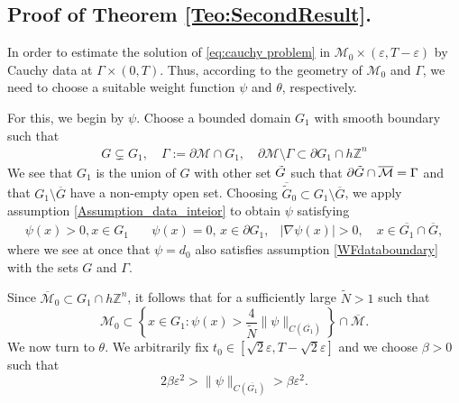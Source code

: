 \documentclass[11pt,oneside,leqno]{amsart}
\numberwithin{equation}{section}
\numberwithin{equation}{section}
\begin{document}
\subsection{Proof of Theorem \ref{Teo:SecondResult}.}\label{subsec:proofsecondresult}
In order to estimate the solution of \eqref{eq:cauchy problem} in $\mathcal{M}_0\times(\varepsilon,T-\varepsilon)$ by Cauchy data at $\Gamma\times(0,T)$. Thus, according to the geometry of $\mathcal{M}_0$ and $\Gamma$, we need to choose a suitable weight function $\psi$ and $\theta$, respectively. 

For this, we begin by $\psi$.  Choose a bounded domain $G_{1}$ with smooth boundary such that
\[\begin{aligned}
    G\subsetneq G_{1},\quad \Gamma:={\partial \mathcal{M}\cap G_1},\quad \partial \mathcal{M}\setminus \Gamma \subset \partial G_1\cap h\mathbb{Z}^{n}
\end{aligned}
\]
We see that $G_1$ is the union of $G$ with other set $\Tilde{G}$  such that $\partial \Tilde{G}\cap\overline{\mathcal{M}}=\Gamma$ and that $G_1\setminus \overline{G}$ have a non-empty open set. Choosing $\overline{\tilde{G}}_0\subset G_1\setminus\overline{G}$, we apply assumption \ref{Assumption_data_inteior} to obtain $\psi$ satisfying 
\begin{equation*}
    \begin{aligned}
        \psi(x)>0, x\in G_1\quad& \psi(x)=0,\,x\in \partial G_1,&|\nabla \psi(x)|>0,\quad x\in \overline{G_1}\cap \overline{G},
    \end{aligned}
\end{equation*}
where we see at once that $\psi=d_0$ also satisfies assumption \ref{WFdataboundary} with the sets $G$ and $\Gamma$. 

Since $\overline{\mathcal{M}}_0\subset G_1\cap h\mathbb{Z}^{n}$, it follows that for a sufficiently large $\tilde{N}>1$ such that
\begin{equation}
    \mathcal{M}_0\subset\left\{x\in G_1: \psi(x)>\frac{4}{\tilde{N}}\|\psi\|_{C(\overline{G_1})}\right\}\cap\overline{\mathcal{M}}.
\end{equation}
We now turn to $\theta$. We arbitrarily fix $t_0\in [\sqrt{2}\varepsilon,T-\sqrt{2}\varepsilon]$ and we choose $\beta>0$ such that
\begin{equation}
2\beta\varepsilon^2>\|\psi\|_{C(\overline{G_1})}>\beta\varepsilon^2.
\end{equation}
\end{document}
